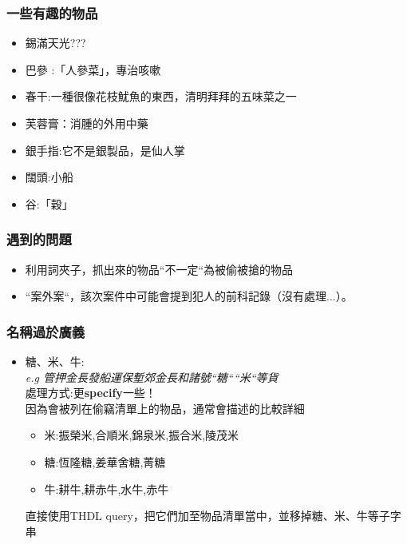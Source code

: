 \documentclass{beamer}
\begin{document}
\begin{frame}
    \frametitle{一些有趣的物品}
    \begin{itemize}
        \item 錫滿天光???
        \item 巴參 :「人參菜」，專治咳嗽
        \item 春干:一種很像花枝魷魚的東西，清明拜拜的五味菜之一
        \item 芙蓉膏：消腫的外用中藥
        \item 銀手指:它不是銀製品，是仙人掌
        \item 闊頭:小船
        \item 谷:「穀」
    \end{itemize}
\end{frame}

\begin{frame}
\frametitle{遇到的問題}
    \begin{itemize}
        \item 利用詞夾子，抓出來的物品``不一定``為被偷被搶的物品
        \item ``案外案``，該次案件中可能會提到犯人的前科記錄（沒有處理...）。
    \end{itemize}
    
\end{frame}

\begin{frame}
\frametitle{名稱過於廣義}
\begin{itemize}
    \item 糖、米、牛:\\
    \textit{e.g 管押金長發船運保塹郊金長和諸號``糖````米``等貨}\\
    \MVRightarrow{}處理方式:更\textbf{specify}一些！\\
    因為會被列在偷竊清單上的物品，通常會描述的比較詳細
    \begin{itemize}
        \item 米:振榮米,合順米,錦泉米,振合米,陵茂米
        \item 糖:恆隆糖,姜華舍糖,菁糖
        \item 牛:耕牛,耕赤牛,水牛,赤牛
    \end{itemize}
    \MVRightarrow{}直接使用THDL query，把它們加至物品清單當中，並移掉糖、米、牛等子字串
\end{itemize}
\end{frame}
\end{document}
